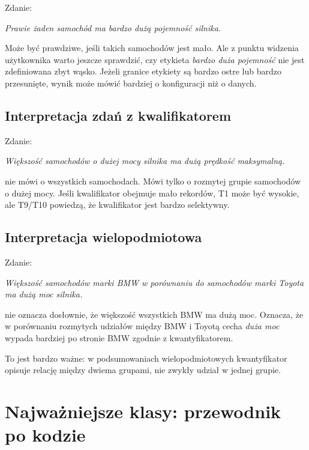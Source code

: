 \documentclass[11pt,a4paper]{article}
\begin{document}
Zdanie:

\begin{center}
\emph{Prawie żaden samochód ma bardzo dużą pojemność silnika.}
\end{center}

Może być prawdziwe, jeśli takich samochodów jest mało. Ale z punktu widzenia użytkownika warto jeszcze sprawdzić, czy etykieta \emph{bardzo duża pojemność} nie jest zdefiniowana zbyt wąsko. Jeżeli granice etykiety są bardzo ostre lub bardzo przesunięte, wynik może mówić bardziej o konfiguracji niż o danych.

\subsection{Interpretacja zdań z kwalifikatorem}

Zdanie:

\begin{center}
\emph{Większość samochodów o dużej mocy silnika ma dużą prędkość maksymalną.}
\end{center}

nie mówi o wszystkich samochodach. Mówi tylko o rozmytej grupie samochodów o dużej mocy. Jeśli kwalifikator obejmuje mało rekordów, T1 może być wysokie, ale T9/T10 powiedzą, że kwalifikator jest bardzo selektywny.

\subsection{Interpretacja wielopodmiotowa}

Zdanie:

\begin{center}
\emph{Większość samochodów marki BMW w porównaniu do samochodów marki Toyota ma dużą moc silnika.}
\end{center}

nie oznacza dosłownie, że większość wszystkich BMW ma dużą moc. Oznacza, że w porównaniu rozmytych udziałów między BMW i Toyotą cecha \emph{duża moc} wypada bardziej po stronie BMW zgodnie z kwantyfikatorem.

To jest bardzo ważne: w podsumowaniach wielopodmiotowych kwantyfikator opisuje relację między dwiema grupami, nie zwykły udział w jednej grupie.

\section{Najważniejsze klasy: przewodnik po kodzie}
\end{document}

